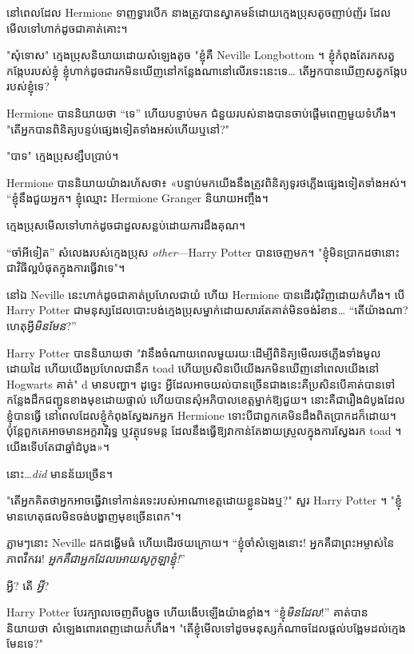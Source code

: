 នៅពេលដែល Hermione ទាញទ្វារបើក នាងត្រូវបានស្វាគមន៍ដោយក្មេងប្រុសតូចញាប់ញ័រ ដែលមើលទៅហាក់ដូចជាគាត់គោះ។

"សុំទោស" ក្មេងប្រុសនិយាយដោយសំឡេងតូច "ខ្ញុំគឺ Neville Longbottom ។ ខ្ញុំ​កំពុង​តែ​រក​សត្វ​កង្កែប​របស់​ខ្ញុំ ខ្ញុំ​ហាក់​ដូច​ជា​រក​មិន​ឃើញ​នៅ​កន្លែង​ណា​នៅ​លើ​រទេះ​នេះ​ទេ… តើ​អ្នក​បាន​ឃើញ​សត្វ​កង្កែប​របស់​ខ្ញុំ​ទេ?

Hermione បាននិយាយថា “ទេ” ហើយបន្ទាប់មក ជំនួយរបស់នាងបានចាប់ផ្ដើមពេញមួយទំហឹង។ "តើអ្នកបានពិនិត្យបន្ទប់ផ្សេងទៀតទាំងអស់ហើយឬនៅ?"

"បាទ" ក្មេងប្រុសខ្សឹបប្រាប់។

Hermione បាន​និយាយ​យ៉ាង​រហ័ស​ថា​៖ «​បន្ទាប់​មក​យើង​នឹង​ត្រូវ​ពិនិត្យ​ទូរថភ្លើង​ផ្សេង​ទៀត​ទាំងអស់​។ “ខ្ញុំនឹងជួយអ្នក។ ខ្ញុំឈ្មោះ Hermione Granger និយាយអញ្ចឹង។

ក្មេងប្រុសមើលទៅហាក់ដូចជាដួលសន្លប់ដោយការដឹងគុណ។

“ចាំអីទៀត” សំលេងរបស់ក្មេងប្រុស \emph{other}—Harry Potter បានចេញមក។ "ខ្ញុំ​មិន​ប្រាកដ​ថា​នោះ​ជា​វិធី​ល្អ​បំផុត​ក្នុង​ការ​ធ្វើ​វា​ទេ"។

នៅឯ Neville នេះហាក់ដូចជាគាត់ប្រហែលជាយំ ហើយ Hermione បានដើរជុំវិញដោយកំហឹង។ បើ Harry Potter ជា​មនុស្ស​ដែល​បោះបង់​ក្មេង​ប្រុស​ម្នាក់​ដោយ​សារ​តែ​គាត់​មិន​ចង់​រំខាន… “តើ​យ៉ាង​ណា? ហេតុអ្វី\emph{មិនមែន}?”

Harry Potter បាននិយាយថា "វានឹងចំណាយពេលមួយរយៈដើម្បីពិនិត្យមើលរថភ្លើងទាំងមូលដោយដៃ ហើយយើងប្រហែលជានឹក toad ហើយប្រសិនបើយើងរកមិនឃើញនៅពេលយើងនៅ Hogwarts គាត់" d មានបញ្ហា។ ដូច្នេះ អ្វី​ដែល​អាច​យល់​បាន​ច្រើន​ជាង​នេះ​គឺ​ប្រសិន​បើ​គាត់​បាន​ទៅ​កន្លែង​ដឹក​ជញ្ជូន​ខាង​មុខ​ដោយ​ផ្ទាល់ ហើយ​បាន​សុំ​អភិបាល​ខេត្ត​ម្នាក់​ឱ្យ​ជួយ។ នោះគឺជារឿងដំបូងដែលខ្ញុំបានធ្វើ នៅពេលដែលខ្ញុំកំពុងស្វែងរកអ្នក Hermione ទោះបីជាពួកគេមិនដឹងពិតប្រាកដក៏ដោយ។ ប៉ុន្តែពួកគេអាចមានអក្ខរាវិរុទ្ធ ឬវត្ថុវេទមន្ត ដែលនឹងធ្វើឱ្យវាកាន់តែងាយស្រួលក្នុងការស្វែងរក toad ។ យើង​ទើប​តែ​ជា​ឆ្នាំ​ដំបូង»។

នោះ…\emph{did} មានន័យច្រើន។

"តើ​អ្នក​គិត​ថា​អ្នក​អាច​ធ្វើ​វា​ទៅ​កាន់​រទេះ​របស់​អាណា​ខេត្ត​ដោយ​ខ្លួន​ឯង​ឬ?" សួរ Harry Potter ។ "ខ្ញុំ​មាន​ហេតុផល​មិន​ចង់​បង្ហាញ​មុខ​ច្រើន​ពេក"។

ភ្លាមៗនោះ Neville ដកដង្ហើមធំ ហើយដើរថយក្រោយ។ “ខ្ញុំចាំសំឡេងនោះ! អ្នកគឺជាព្រះអម្ចាស់នៃភាពវឹកវរ! \emph{អ្នកគឺជាអ្នកដែលអោយសូកូឡាខ្ញុំ!}”

អ្វី? តើ \emph{អ្វី}?

Harry Potter បែរក្បាលចេញពីបង្អួច ហើយងើបឡើងយ៉ាងខ្លាំង។ “ខ្ញុំ\emph{មិនដែល}!” គាត់បាននិយាយថា សំឡេងពោរពេញដោយកំហឹង។ "តើខ្ញុំមើលទៅដូចមនុស្សកំណាចដែលផ្តល់បង្អែមដល់ក្មេងមែនទេ?"

